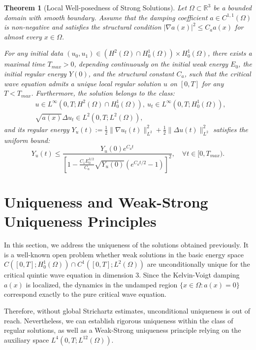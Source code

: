 \documentclass[11pt,letterpaper]{amsart}
\newtheorem{theorem}{Theorem}[section]
\begin{document}
\begin{theorem}[Local Well-posedness of Strong Solutions]\label{thm:local_strong}
Let $\Omega \subset \mathbb{R}^3$ be a bounded domain with smooth boundary. Assume that the damping coefficient $a \in C^{1,1}(\Omega)$ is non-negative and satisfies the structural condition $|\nabla a(x)|^2 \le C_a a(x)$ for almost every $x \in \Omega$.

For any initial data $(u_0, u_1) \in \left(H^2(\Omega) \cap H_0^1(\Omega) \right) \times H_0^1(\Omega)$, there exists a maximal time $T_{max} > 0$, depending continuously on the initial weak energy $E_0$, the initial regular energy $Y(0)$, and the structural constant $C_a$, such that the critical wave equation admits a unique local regular solution $u$ on $[0, T]$ for any $T < T_{max}$.
Furthermore, the solution belongs to the
 class:
\begin{align*}
    &u \in L^\infty(0,T; H^2(\Omega) \cap H_0^1(\Omega)), ~u_t \in L^\infty(0,T; H_0^1(\Omega)), \\
    &\sqrt{a(x)} \Delta u_t \in L^2(0,T; L^2(\Omega)),
\end{align*}
and its regular energy $Y_u(t) := \frac{1}{2}\|\nabla u_t(t)\|_{L^2}^2 + \frac{1}{2}\|\Delta u(t)\|_{L^2}^2$ satisfies the uniform bound:
\begin{equation}\label{eq:strong_energy_bound}
    Y_u(t) \le \frac{Y_u(0) e^{C_a t}}{\left[ 1 - \frac{C_1 E_0^{3/2}}{C_a} \sqrt{Y_u(0)} \left( e^{C_a t / 2} - 1 \right) \right]^2}, \quad \forall t \in [0, T_{max}).
\end{equation}
\end{theorem}

\section{Uniqueness and Weak-Strong Uniqueness Principles}

In this section, we address the uniqueness of the solutions obtained previously. It is a well-known open problem whether weak solutions in the basic energy space $C([0,T]; H_0^1(\Omega)) \cap C^1([0,T]; L^2(\Omega))$ are unconditionally unique for the critical quintic wave equation in dimension 3. Since the Kelvin-Voigt damping $a(x)$ is localized, the dynamics in the undamped region $\{x \in \Omega : a(x) = 0\}$ correspond exactly to the pure critical wave equation.

Therefore, without global Strichartz estimates, unconditional uniqueness is out of reach. Nevertheless, we can establish rigorous uniqueness within the class of regular solutions, as well as a Weak-Strong uniqueness principle relying on the auxiliary space $L^4(0,T; L^{12}(\Omega))$.
\end{document}
